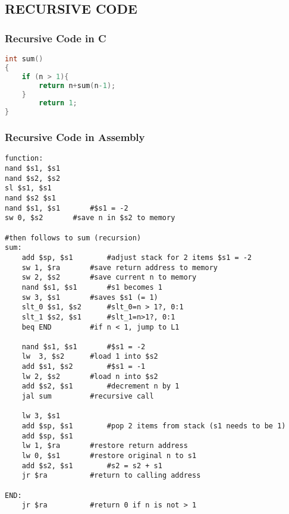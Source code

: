 \documentclass[11pt, titlepage]{article}
\begin{document}
    \subsection{RECURSIVE CODE}
    \subsubsection{Recursive Code in C}
   \begin{lstlisting}[language = C]
int sum()
{
	if (n > 1){
		return n+sum(n-1);
	}
		return 1;
}
   \end{lstlisting}
\subsubsection{Recursive Code in Assembly}
   \begin{lstlisting}[language=Ant]
function:
nand $s1, $s1
nand $s2, $s2  
sl $s1, $s1
nand $s2 $s1
nand $s1, $s1		#$s1 = -2	
sw 0, $s2		#save n in $s2 to memory

#then follows to sum (recursion)
sum:
	add $sp, $s1		#adjust stack for 2 items $s1 = -2
	sw 1, $ra		#save return address to memory
	sw 2, $s2		#save current n to memory
	nand $s1, $s1		#s1 becomes 1
	sw 3, $s1		#saves $s1 (= 1)
	slt_0 $s1, $s2		#slt_0=n > 1?, 0:1	
	slt_1 $s2, $s1		#slt_1=n>1?, 0:1 	
	beq END			#if n < 1, jump to L1
	
	nand $s1, $s1		#$s1 = -2
	lw  3, $s2		#load 1 into $s2
	add $s1, $s2		#$s1 = -1
	lw 2, $s2		#load n into $s2
	add $s2, $s1		#decrement n by 1
	jal sum			#recursive call
	
	lw 3, $s1
	add $sp, $s1		#pop 2 items from stack (s1 needs to be 1)
	add $sp, $s1
	lw 1, $ra		#restore return address
	lw 0, $s1		#restore original n to s1
	add $s2, $s1		#s2 = s2 + s1
	jr $ra			#return to calling address

END: 
	jr $ra			#return 0 if n is not > 1
	\end{lstlisting}
    
\end{document}
